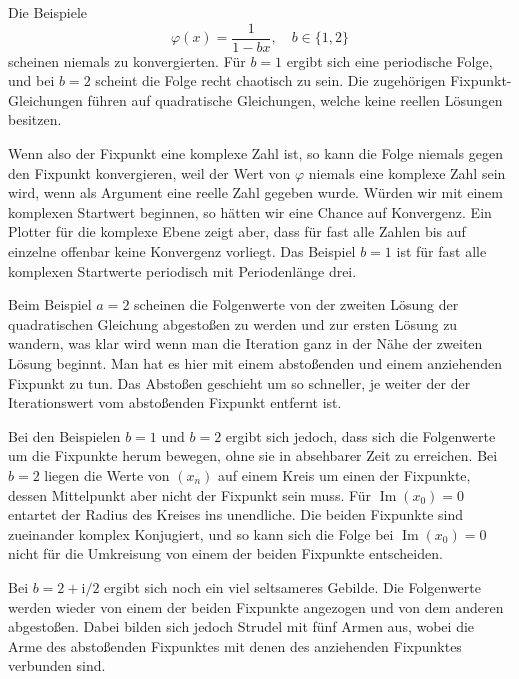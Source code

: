 \documentclass[a4paper,11pt,fleqn,twoside]{scrartcl}
\numberwithin{equation}{section}
\renewcommand{\Im}{\operatorname{Im}}
\newcommand{\ui}{\mathrm i}
\begin{document}
Die Beispiele
\begin{equation}
\varphi(x) = \frac{1}{1-bx},\quad b\in\{1,2\}
\end{equation}
scheinen niemals zu konvergierten. Für $b=1$ ergibt sich eine
periodische Folge, und bei $b=2$ scheint die Folge recht
chaotisch zu sein. Die zugehörigen Fixpunkt-Gleichungen führen
auf quadratische Gleichungen, welche keine reellen Lösungen
besitzen.

Wenn also der Fixpunkt eine komplexe Zahl ist, so kann die Folge
niemals gegen den Fixpunkt konvergieren, weil der Wert von $\varphi$
niemals eine komplexe Zahl sein wird, wenn als Argument eine
reelle Zahl gegeben wurde. Würden wir mit einem komplexen Startwert
beginnen, so hätten wir eine Chance auf Konvergenz. Ein Plotter
für die komplexe Ebene zeigt aber, dass für fast alle
Zahlen bis auf einzelne offenbar keine Konvergenz vorliegt.
Das Beispiel $b=1$ ist für fast alle komplexen Startwerte periodisch
mit Periodenlänge drei.

Beim Beispiel $a=2$ scheinen die Folgenwerte von der zweiten
Lösung der quadratischen Gleichung abgestoßen zu werden
und zur ersten Lösung zu wandern, was klar wird wenn man die
Iteration ganz in der Nähe der zweiten Lösung beginnt.
Man hat es hier mit einem abstoßenden und einem anziehenden
Fixpunkt zu tun. Das Abstoßen geschieht um so schneller, je weiter
der der Iterationswert vom abstoßenden Fixpunkt entfernt ist.

Bei den Beispielen $b=1$ und $b=2$ ergibt sich jedoch, dass sich
die Folgenwerte um die Fixpunkte herum bewegen, ohne sie in
absehbarer Zeit zu erreichen. Bei $b=2$ liegen die Werte
von $(x_n)$ auf einem Kreis um einen der Fixpunkte, dessen
Mittelpunkt aber nicht der Fixpunkt sein muss. Für
$\Im(x_0)=0$ entartet der Radius des Kreises ins unendliche. Die
beiden Fixpunkte sind zueinander komplex Konjugiert, und so kann
sich die Folge bei $\Im(x_0)=0$ nicht für die Umkreisung von einem
der beiden Fixpunkte entscheiden.

Bei $b=2+\ui/2$ ergibt sich noch ein viel seltsameres Gebilde.
Die Folgenwerte werden wieder von einem der beiden Fixpunkte
angezogen und von dem anderen abgestoßen. Dabei bilden sich
jedoch Strudel mit fünf Armen aus, wobei die Arme des abstoßenden
Fixpunktes mit denen des anziehenden Fixpunktes verbunden sind.
\end{document}
